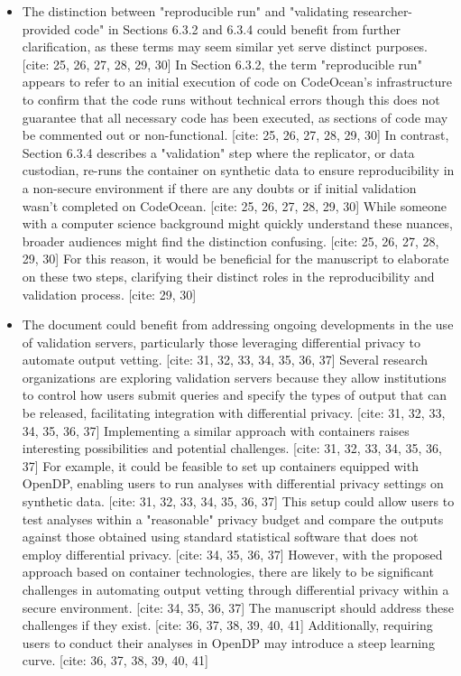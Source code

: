 \begin{referee}
\begin{itemize}
    \item The distinction between "reproducible run" and "validating researcher-provided code" in Sections 6.3.2 and 6.3.4 could benefit from further clarification, as these terms may seem similar yet serve distinct purposes. [cite: 25, 26, 27, 28, 29, 30] In Section 6.3.2, the term "reproducible run" appears to refer to an initial execution of code on CodeOcean's infrastructure to confirm that the code runs without technical errors though this does not guarantee that all necessary code has been executed, as sections of code may be commented out or non-functional. [cite: 25, 26, 27, 28, 29, 30] In contrast, Section 6.3.4 describes a "validation" step where the replicator, or data custodian, re-runs the container on synthetic data to ensure reproducibility in a non-secure environment if there are any doubts or if initial validation wasn't completed on CodeOcean. [cite: 25, 26, 27, 28, 29, 30] While someone with a computer science background might quickly understand these nuances, broader audiences might find the distinction confusing. [cite: 25, 26, 27, 28, 29, 30] For this reason, it would be beneficial for the manuscript to elaborate on these two steps, clarifying their distinct roles in the reproducibility and validation process. [cite: 29, 30]
    \item The document could benefit from addressing ongoing developments in the use of validation servers, particularly those leveraging differential privacy to automate output vetting. [cite: 31, 32, 33, 34, 35, 36, 37] Several research organizations are exploring validation servers because they allow institutions to control how users submit queries and specify the types of output that can be released, facilitating integration with differential privacy. [cite: 31, 32, 33, 34, 35, 36, 37] Implementing a similar approach with containers raises interesting possibilities and potential challenges. [cite: 31, 32, 33, 34, 35, 36, 37] For example, it could be feasible to set up containers equipped with OpenDP, enabling users to run analyses with differential privacy settings on synthetic data. [cite: 31, 32, 33, 34, 35, 36, 37] This setup could allow users to test analyses within a "reasonable" privacy budget and compare the outputs against those obtained using standard statistical software that does not employ differential privacy. [cite: 34, 35, 36, 37] However, with the proposed approach based on container technologies, there are likely to be significant challenges in automating output vetting through differential privacy within a secure environment. [cite: 34, 35, 36, 37] The manuscript should address these challenges if they exist. [cite: 36, 37, 38, 39, 40, 41] Additionally, requiring users to conduct their analyses in OpenDP may introduce a steep learning curve. [cite: 36, 37, 38, 39, 40, 41]

\end{itemize}
\end{referee}
